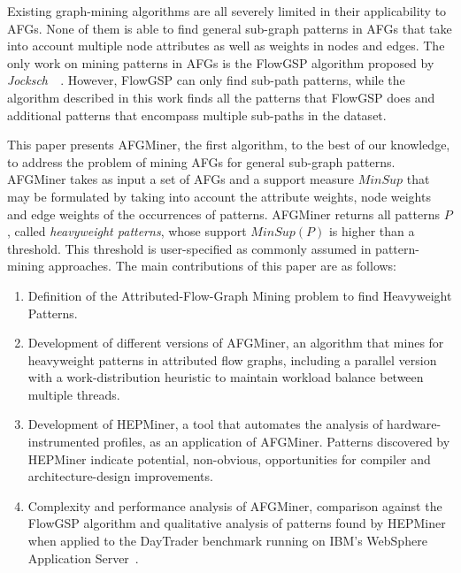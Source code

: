 Existing graph-mining algorithms are all severely limited in their applicability to AFGs. None of them is able to find general sub-graph patterns in AFGs that take into account multiple node attributes as well as weights in nodes and edges. The only work on mining patterns in AFGs is the FlowGSP algorithm proposed by \emph{Jocksch~\etal}~\cite{FlowGSP}. However, FlowGSP can only find sub-path patterns, while the algorithm described in this work finds all the patterns that FlowGSP does and additional patterns that encompass multiple sub-paths in the dataset.  

This paper presents AFGMiner, the first algorithm, to the best of our knowledge, to address the problem of mining AFGs for general sub-graph patterns. AFGMiner takes as input a set of AFGs and a support measure $MinSup$ that may be formulated by taking into account the attribute weights, node weights and edge weights of the occurrences of patterns. AFGMiner returns all patterns $P$, called \emph{heavyweight patterns}, whose support $MinSup(P)$ is higher than a threshold. This threshold is user-specified as commonly assumed in pattern-mining approaches.
The main contributions of this paper are as follows: 

\begin{enumerate}
\item Definition of the Attributed-Flow-Graph Mining problem to find Heavyweight Patterns.

\item Development of different versions of AFGMiner, an algorithm that mines for heavyweight patterns in attributed flow graphs, including a parallel version with a work-distribution heuristic to maintain workload balance between multiple threads.

\item Development of HEPMiner, a tool that automates the analysis of hardware-instrumented profiles, as an application of AFGMiner. Patterns discovered by HEPMiner indicate potential, non-obvious, opportunities for compiler and architecture-design improvements.

\item Complexity and performance analysis of AFGMiner, comparison against the FlowGSP algorithm and qualitative analysis of patterns found by HEPMiner when applied to the DayTrader benchmark running on IBM's WebSphere Application Server~\cite{WAS}.
\end{enumerate} 




